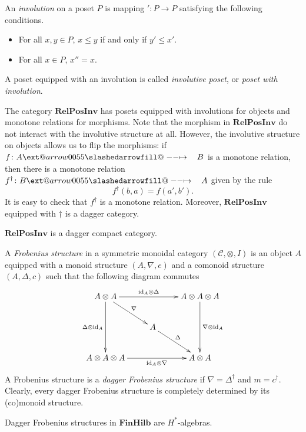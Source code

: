 \documentclass{beamer}
\makeatletter
\newcommand{\id}{\mathrm{id}}
\newcommand{\C}{\mathcal{C}}
\newcommand{\FinHilb}{\mathbf{FinHilb}}
\newcommand{\RelPosInv}{\mathbf{RelPosInv}}
\def\slashedarrowfill@#1#2#3#4#5{%
  $\m@th\thickmuskip0mu\medmuskip\thickmuskip\thinmuskip\thickmuskip
  \relax#5#1\mkern-7mu%
  \cleaders\hbox{$#5\mkern-2mu#2\mkern-2mu$}\hfill
  \mathclap{#3}\mathclap{#2}%
  \cleaders\hbox{$#5\mkern-2mu#2\mkern-2mu$}\hfill
  \mkern-7mu#4$%
}
\def\rightslashedarrowfill@{%
  \slashedarrowfill@\relbar\relbar\mapstochar\rightarrow}
\newcommand\xslashedrightarrow[2][]{%
  \ext@arrow 0055{\rightslashedarrowfill@}{#1}{#2}}
\newcommand{\sto}{\xslashedrightarrow{\hskip 1pc}}
\makeatother
\begin{document}
\begin{frame}
An {\em involution} on a poset $P$ is mapping $'\colon P\to P$ satisfying the following
conditions.
\begin{itemize}
\item For all $x,y\in P$, $x≤y$ if and only if $y'≤x'$.
\item For all $x\in P$, $x''=x$.
\end{itemize}
A poset equipped with an involution is called {\em involutive poset}, or
{\em poset with involution}.
\end{frame}
\begin{frame}
The category $\RelPosInv$ has posets equipped with involutions for objects and
monotone relations for morphisms. Note that the morphism in $\RelPosInv$ do not
interact with the involutive structure at all. However, the involutive structure
on objects allows us to flip the morphisms: if $f\colon A\sto B$ is a monotone
relation, then there is a monotone relation $f^\dag\colon B\sto A$ given by the
rule
$$
f^\dag(b,a)=f(a',b').
$$ 
It is easy to check that $f^\dag$ is a monotone relation.
Moreover, $\RelPosInv$ equipped with $\dag$ is a dagger category.
\end{frame}
\begin{frame}
\begin{theorem}[GJ]
$\RelPosInv$ is a dagger compact category.
\end{theorem}
\end{frame}
\begin{frame}
A {\em Frobenius structure} in a symmetric monoidal category $(\C,\otimes,I)$ is an object
$A$ equipped with a monoid structure $(A,\nabla,e)$ and a comonoid structure
$(A,\Delta,c)$ such that the following diagram commutes
\begin{equation}
\label{diag:frobenius}
\xymatrix{
A\otimes A
	\ar[rr]^-{\id_A\otimes\Delta}
	\ar[rd]^-{\nabla}
	\ar[dd]_-{\Delta\otimes\id_A}
&
~
&
A\otimes A\otimes A
	\ar[dd]^-{\nabla\otimes\id_A}
\\
~
&
A
	\ar[rd]^-{\Delta}
\\
A\otimes A\otimes A
	\ar[rr]_-{\id_A\otimes\nabla}
&
~
&
A\otimes A
}
\end{equation}
A Frobenius structure is a {\em dagger Frobenius structure} if
$\nabla=\Delta^\dag$ and $m=c^\dag$. Clearly, every dagger Frobenius structure
is completely determined by its (co)monoid structure.
\end{frame}
\begin{frame}
\begin{theorem}[Vicary] Dagger Frobenius structures in $\FinHilb$ are $H^*$-algebras.
\end{theorem}
\end{frame}
\end{document}
